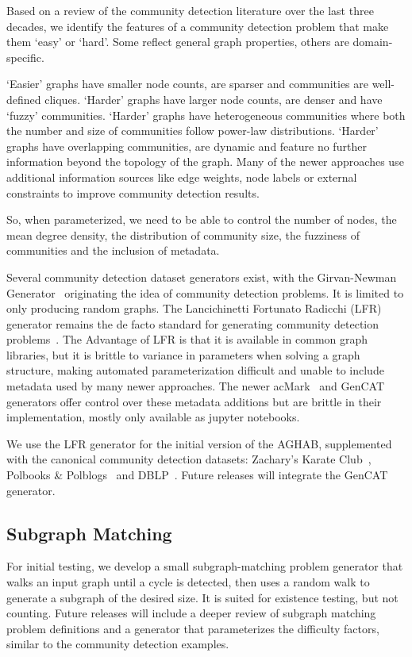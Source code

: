 Based on a review of the community detection literature over the last three decades, we identify the features of a community detection problem that make them `easy' or `hard'.
Some reflect general graph properties, others are domain-specific. 

`Easier' graphs have smaller node counts, are sparser and communities are well-defined cliques. 
`Harder' graphs have larger node counts, are denser and have `fuzzy' communities. 
`Harder' graphs have heterogeneous communities where both the number and size of communities follow power-law distributions.
`Harder' graphs have overlapping communities, are dynamic and feature no further information beyond the topology of the graph.
Many of the newer approaches use additional information sources like edge weights, node labels or external constraints to improve community detection results. 

So, when parameterized, we need to be able to control the number of nodes, the mean degree density, the distribution of community size, the fuzziness of communities and the inclusion of metadata.

Several community detection dataset generators exist, with the Girvan-Newman Generator~\cite{Girvan2002} originating the idea of community detection problems. 
It is limited to only producing random graphs. 
The Lancichinetti Fortunato Radicchi (LFR) generator remains the de facto standard for generating community detection problems~\cite{Lancichinetti2008}. 
The Advantage of LFR is that it is available in common graph libraries, but it is brittle to variance in parameters when solving a graph structure, making automated parameterization difficult and unable to include metadata used by many newer approaches. 
The newer acMark~\cite{Maekawa2019} and GenCAT~\cite{Maekawa2023} generators offer control over these metadata additions but are brittle in their implementation, mostly only available as jupyter notebooks. 

We use the LFR generator for the initial version of the AGHAB, supplemented with the canonical community detection datasets: Zachary's Karate Club~\cite{Zachary1977}, Polbooks \& Polblogs~\cite{Newman2006} and DBLP~\cite{Yang2012}.
Future releases will integrate the GenCAT generator. 

\subsection{Subgraph Matching}
For initial testing, we develop a small subgraph-matching problem generator that walks an input graph until a cycle is detected, then uses a random walk to generate a subgraph of the desired size.
It is suited for existence testing, but not counting.
Future releases will include a deeper review of subgraph matching problem definitions and a generator that parameterizes the difficulty factors, similar to the community detection examples. 


